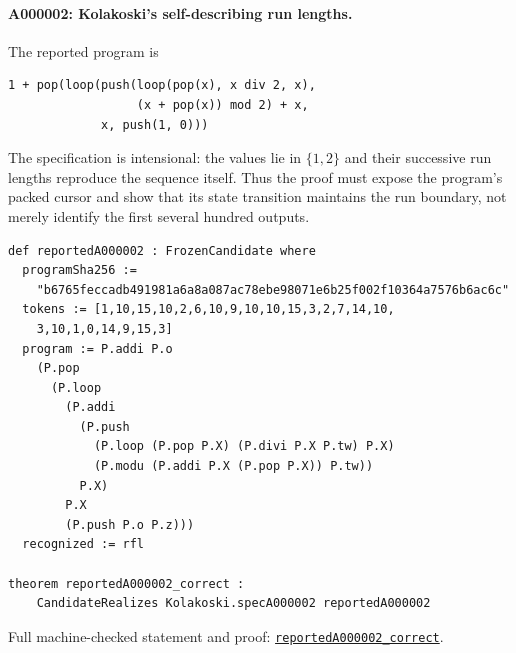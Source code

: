 \documentclass[11pt]{article}
\newcommand{\formalcommit}{f3a31db36bb2f944312ee31c1d86c2758109e83a}
\newcommand{\formalblob}{https://github.com/zariuq/MeTTapedia/blob/\formalcommit/lean/mettapedia/Mettapedia}
\newcommand{\leansource}[3]{%
  \href{\formalblob/#1\#L#2}{\nolinkurl{#3}}}
\begin{document}
\paragraph{A000002: Kolakoski's self-describing run lengths.}
The reported program is
\begin{lstlisting}
1 + pop(loop(push(loop(pop(x), x div 2, x),
                  (x + pop(x)) mod 2) + x,
             x, push(1, 0)))
\end{lstlisting}
The specification is intensional: the values lie in $\{1,2\}$ and their successive run
lengths reproduce the sequence itself. Thus the proof must expose the program's packed
cursor and show that its state transition maintains the run boundary, not merely identify
the first several hundred outputs.
\begin{lstlisting}[caption={The reported Kolakoski artifact and its universal Lean theorem.}]
def reportedA000002 : FrozenCandidate where
  programSha256 :=
    "b6765feccadb491981a6a8a087ac78ebe98071e6b25f002f10364a7576b6ac6c"
  tokens := [1,10,15,10,2,6,10,9,10,10,15,3,2,7,14,10,
    3,10,1,0,14,9,15,3]
  program := P.addi P.o
    (P.pop
      (P.loop
        (P.addi
          (P.push
            (P.loop (P.pop P.X) (P.divi P.X P.tw) P.X)
            (P.modu (P.addi P.X (P.pop P.X)) P.tw))
          P.X)
        P.X
        (P.push P.o P.z)))
  recognized := rfl

theorem reportedA000002_correct :
    CandidateRealizes Kolakoski.specA000002 reportedA000002
\end{lstlisting}
\noindent Full machine-checked statement and proof:
\leansource{GSLT/LanguageDef/Gauthier/ReportedSequencePrograms.lean}{639-L675}{reportedA000002_correct}.

\end{document}
